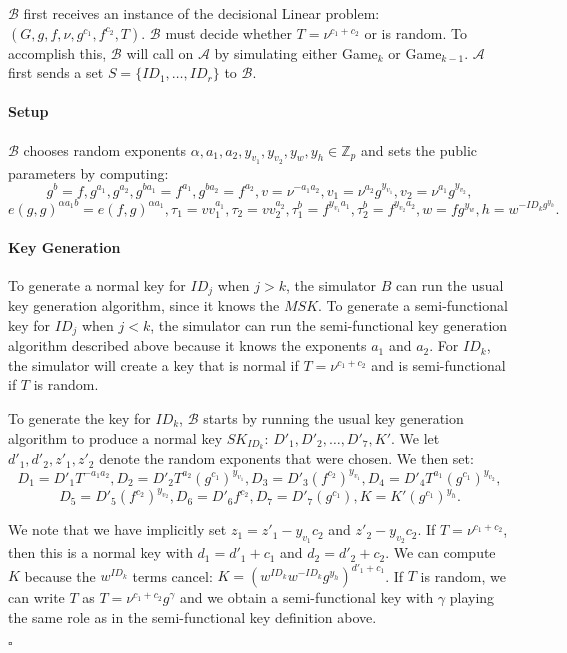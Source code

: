 \documentclass[a4paper, 11pt]{article}
\newenvironment{proof}{\par\noindent{\bf Proof.}}{$\square$\par\bigskip}
\newcommand{\Z}{\ensuremath{\mathbb{Z}}}
\theoremstyle{definition}
\begin{document}
\begin{proof} $\mathcal{B}$ first receives an instance of the decisional Linear problem: $(G, g, f , \nu, g^{c_1}, f^{c_2}, T)$. $\mathcal{B}$ must decide whether $T = \nu^{c_1+c_2}$ or is random. To accomplish this, $\mathcal{B}$ will call on $\mathcal{A}$ by simulating either Game$_{k}$ or Game$_{k-1}$. $\mathcal{A}$ first sends a set $S = \{ID_1, \ldots, ID_r\}$ to $\mathcal{B}$.

\paragraph{Setup} $\mathcal{B}$ chooses random exponents $\alpha, a_1, a_2, y_{v_1}, y_{v_2}, y_w, y_h \in \Z_p$ and sets the public parameters by computing:
\[g^b = f, g^{a_1}, g^{a_2}, g^{ba_1} = f^{a_1}, g^{b a_2} = f^{a_2}, v = \nu^{-a_1a_2},
 v_1 = \nu^{a_2}g^{y_{v_1}}, v_2 = \nu^{a_1}g^{y_{v_2}}, \] \[e(g,g)^{\alpha a_1 b} = e(f,g)^{\alpha a_1},
 \tau_1 = v v_1^{a_1}, \tau_2 = v v_2^{a_2}, \tau_1^b = f^{y_{v_1}a_1}, \tau_2^b = f^{y_{v_2}a_2},
w = fg^{y_w}, h = w^{-ID_k g^{y_h}}.\]

\paragraph{Key Generation} To generate a normal key for $ID_j$ when $j > k$, the simulator $B$ can run the usual key generation algorithm, since it knows the $MSK$. To generate a semi-functional key for $ID_j$ when $j < k$, the simulator can run the semi-functional key generation algorithm described above because it knows the exponents $a_1$ and $a_2$. For $ID_k$, the simulator will create a key that is normal if $T = \nu^{c_1 + c_2}$ and is semi-functional if $T$ is random.

To generate the key for $ID_k$, $\mathcal{B}$ starts by running the usual key generation algorithm to produce a normal key $SK_{ID_k}$: $D'_1, D'_2, \ldots, D'_7, K'$. We let $d'_1, d'_2, z'_1, z'_2$ denote the random exponents that were chosen. We then set:
\[ D_1 = D'_1 T^{-a_1a_2}, D_2 = D'_2 T^{a_2}(g^{c_1})^{y_{v_1}}, D_3 = D'_3 (f^{c_2})^{y_{v_1}}, D_4 = D'_4 T^{a_1} (g^{c_1})^{y_{v_2}},\]
\[ D_5 = D'_5 (f^{c_2})^{y_{v_2}}, D_6 = D'_6 f^{c_2}, D_7 = D'_7 (g^{c_1}), K = K' (g^{c_1})^{y_h}.\]

We note that we have implicitly set $z_1 = z'_1 - y_{v_1}c_2$ and $z'_2 - y_{v_2}c_2$. If $T = \nu^{c_1+c_2}$, then this is a normal key with $d_1 = d'_1 + c_1$ and $d_2 = d'_2 + c_2$. We can compute $K$ because the $w^{ID_k}$ terms cancel: $K = (w^{ID_k} w^{-ID_k} g^{y_h})^{d'_1 + c_1}$. If $T$ is random, we can write $T$ as $T = \nu^{c_1+c_2} g^{\gamma}$ and we obtain a semi-functional key with $\gamma$ playing the same role as in the semi-functional key definition above.


\end{proof}
\end{document}
